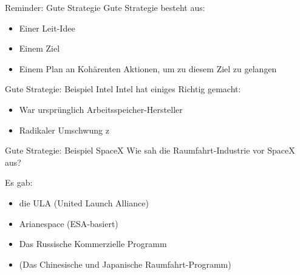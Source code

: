 \documentclass[12pt,compress,ngerman,utf8,t]{beamer}
\begin{document}
\begin{frame}{Reminder: Gute Strategie}
    Gute Strategie besteht aus:
    \begin{itemize}
        \item Einer Leit-Idee
        \item Einem Ziel
        \item Einem Plan an Kohärenten Aktionen, um zu diesem Ziel zu gelangen
    \end{itemize}
\end{frame}

\begin{frame}[c]{Gute Strategie: Beispiel Intel}
    Intel hat einiges Richtig gemacht:
    \begin{itemize}
        \item War ursprünglich Arbeitsspeicher-Hersteller \pause
        \item Radikaler Umschwung z
    \end{itemize}
\end{frame}



\begin{frame}[c]{Gute Strategie: Beispiel SpaceX}
    Wie sah die Raumfahrt-Industrie vor SpaceX aus? \pause
    

    Es gab:
    \begin{itemize}
        \item die ULA (United Launch Alliance)
        \item Arianespace (ESA-basiert)
        \item Das Russische Kommerzielle Programm
        \item (Das Chinesische und Japanische Raumfahrt-Programm)
    \end{itemize}

\end{frame}
\end{document}
